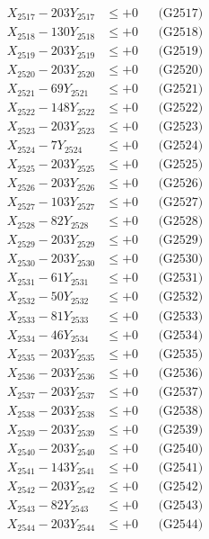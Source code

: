 \documentclass[a4paper,10pt]{article}
\begin{document}
{\begin{align}
X_{2517} - 203Y_{2517} &\leq +0 && \text{(G2517)} \\
X_{2518} - 130Y_{2518} &\leq +0 && \text{(G2518)} \\
X_{2519} - 203Y_{2519} &\leq +0 && \text{(G2519)} \\
X_{2520} - 203Y_{2520} &\leq +0 && \text{(G2520)} \\
\allowbreak
X_{2521} - 69Y_{2521} &\leq +0 && \text{(G2521)} \\
X_{2522} - 148Y_{2522} &\leq +0 && \text{(G2522)} \\
X_{2523} - 203Y_{2523} &\leq +0 && \text{(G2523)} \\
X_{2524} - 7Y_{2524} &\leq +0 && \text{(G2524)} \\
X_{2525} - 203Y_{2525} &\leq +0 && \text{(G2525)} \\
X_{2526} - 203Y_{2526} &\leq +0 && \text{(G2526)} \\
X_{2527} - 103Y_{2527} &\leq +0 && \text{(G2527)} \\
X_{2528} - 82Y_{2528} &\leq +0 && \text{(G2528)} \\
X_{2529} - 203Y_{2529} &\leq +0 && \text{(G2529)} \\
X_{2530} - 203Y_{2530} &\leq +0 && \text{(G2530)} \\
\allowbreak
X_{2531} - 61Y_{2531} &\leq +0 && \text{(G2531)} \\
X_{2532} - 50Y_{2532} &\leq +0 && \text{(G2532)} \\
X_{2533} - 81Y_{2533} &\leq +0 && \text{(G2533)} \\
X_{2534} - 46Y_{2534} &\leq +0 && \text{(G2534)} \\
X_{2535} - 203Y_{2535} &\leq +0 && \text{(G2535)} \\
X_{2536} - 203Y_{2536} &\leq +0 && \text{(G2536)} \\
X_{2537} - 203Y_{2537} &\leq +0 && \text{(G2537)} \\
X_{2538} - 203Y_{2538} &\leq +0 && \text{(G2538)} \\
X_{2539} - 203Y_{2539} &\leq +0 && \text{(G2539)} \\
X_{2540} - 203Y_{2540} &\leq +0 && \text{(G2540)} \\
\allowbreak
X_{2541} - 143Y_{2541} &\leq +0 && \text{(G2541)} \\
X_{2542} - 203Y_{2542} &\leq +0 && \text{(G2542)} \\
X_{2543} - 82Y_{2543} &\leq +0 && \text{(G2543)} \\
X_{2544} - 203Y_{2544} &\leq +0 && \text{(G2544)} \\

\end{align}}
\end{document}
